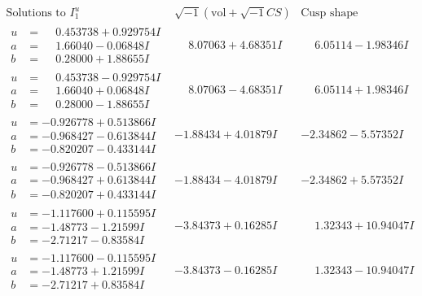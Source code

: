 \documentclass[1p]{elsarticle_modified}
\theoremstyle{definition}
\newcommand{\I}{\sqrt{-1}}
\begin{document}
$$\begin{array}{c|c|c}  
\text{Solutions to }I^u_{1}& \I (\text{vol} + \sqrt{-1}CS) & \text{Cusp shape}\\
 \hline 
\begin{aligned}
u &= \phantom{-}0.453738 + 0.929754 I \\
a &= \phantom{-}1.66040 - 0.06848 I \\
b &= \phantom{-}0.28000 + 1.88655 I\end{aligned}
 & \phantom{-}8.07063 + 4.68351 I & \phantom{-}6.05114 - 1.98346 I \\ \hline\begin{aligned}
u &= \phantom{-}0.453738 - 0.929754 I \\
a &= \phantom{-}1.66040 + 0.06848 I \\
b &= \phantom{-}0.28000 - 1.88655 I\end{aligned}
 & \phantom{-}8.07063 - 4.68351 I & \phantom{-}6.05114 + 1.98346 I \\ \hline\begin{aligned}
u &= -0.926778 + 0.513866 I \\
a &= -0.968427 - 0.613844 I \\
b &= -0.820207 - 0.433144 I\end{aligned}
 & -1.88434 + 4.01879 I & -2.34862 - 5.57352 I \\ \hline\begin{aligned}
u &= -0.926778 - 0.513866 I \\
a &= -0.968427 + 0.613844 I \\
b &= -0.820207 + 0.433144 I\end{aligned}
 & -1.88434 - 4.01879 I & -2.34862 + 5.57352 I \\ \hline\begin{aligned}
u &= -1.117600 + 0.115595 I \\
a &= -1.48773 - 1.21599 I \\
b &= -2.71217 - 0.83584 I\end{aligned}
 & -3.84373 + 0.16285 I & \phantom{-}1.32343 + 10.94047 I \\ \hline\begin{aligned}
u &= -1.117600 - 0.115595 I \\
a &= -1.48773 + 1.21599 I \\
b &= -2.71217 + 0.83584 I\end{aligned}
 & -3.84373 - 0.16285 I & \phantom{-}1.32343 - 10.94047 I \\ \hline\begin{aligned}

\end{aligned}
\end{array}$$
\end{document}
